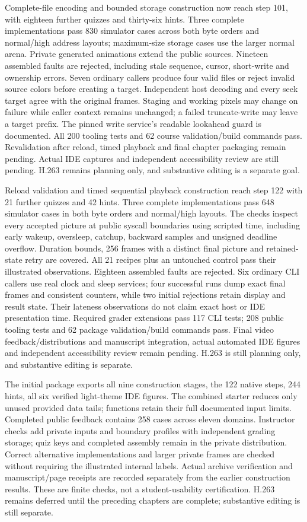 Complete-file encoding and bounded storage construction now reach step 101, with
eighteen further quizzes and thirty-six hints. Three complete implementations pass
830 simulator cases across both byte orders and normal/high address layouts;
maximum-size storage cases use the larger normal arena. Private generated animations
extend the public sources. Nineteen assembled faults are rejected, including stale
sequence, cursor, short-write and ownership errors. Seven ordinary callers produce
four valid files or reject invalid source colors before creating a target. Independent
host decoding and every seek target agree with the original frames. Staging and
working pixels may change on failure while caller context remains unchanged; a
failed truncate-write may leave a target prefix. The pinned write service's readable
lookahead guard is documented. All 200 tooling tests and 62 course validation/build
commands pass. Revalidation after reload, timed playback and final chapter packaging
remain pending. Actual IDE captures and independent accessibility review are still
pending. H.263 remains planning only, and substantive editing is a separate goal.


Reload validation and timed sequential playback construction reach step 122 with
21 further quizzes and 42 hints. Three complete implementations pass 648 simulator
cases in both byte orders and normal/high layouts. The checks inspect every accepted
picture at public syscall boundaries using scripted time, including early wakeup,
oversleep, catchup, backward samples and unsigned deadline overflow. Duration bounds,
256 frames with a distinct final picture and retained-state retry are covered.
All 21 recipes plus an untouched control pass their illustrated observations.
Eighteen assembled faults are rejected. Six ordinary CLI callers use real clock
and sleep services; four successful runs dump exact final frames and consistent
counters, while two initial rejections retain display and result state. Their
lateness observations do not claim exact host or IDE presentation time. Required
grader extensions pass 117 CLI tests; 208 public tooling tests and 62 package
validation/build commands pass. Final video feedback/distributions and manuscript
integration, actual automated IDE figures and independent accessibility review
remain pending. H.263 is still planning only, and substantive editing is separate.


The initial package exports all nine construction stages, the 122 native steps,
244 hints, all six verified light-theme IDE figures. The combined starter reduces only
unused provided data tails; functions retain their full documented input limits.
Completed public feedback contains 258 cases across eleven domains. Instructor
checks add private inputs and boundary profiles with independent grading storage;
quiz keys and completed assembly remain in the private distribution. Correct
alternative implementations and larger private frames are checked without requiring
the illustrated internal labels. Actual archive verification and manuscript/page
receipts are recorded separately from the earlier construction results. These are
finite checks, not a student-usability certification. H.263 remains deferred until
the preceding chapters are complete; substantive editing is still separate.


